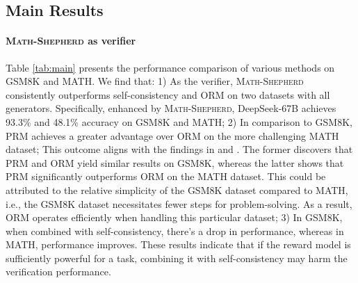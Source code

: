 \documentclass{article} %
\newcommand{\methodname}{\textsc{Math-Shepherd}\xspace}
\begin{document}
\subsection{Main Results}
\paragraph{\methodname as verifier}
Table \ref{tab:main} presents the performance comparison of various methods on GSM8K and MATH. 
We find that:
1) As the verifier, \methodname consistently outperforms self-consistency and ORM on two datasets with all generators. Specifically, enhanced by \methodname, DeepSeek-67B achieves 93.3\% and 48.1\% accuracy on GSM8K and MATH;
2) In comparison to GSM8K, PRM achieves a greater advantage over ORM on the more challenging MATH dataset;
This outcome aligns with the findings in \cite{uesato2022solving} and \cite{lightman2023let}. The former discovers that PRM and ORM yield similar results on GSM8K, whereas the latter shows that PRM significantly outperforms ORM on the MATH dataset.
This could be attributed to the relative simplicity of the GSM8K dataset compared to MATH, i.e., the GSM8K dataset necessitates fewer steps for problem-solving. 
As a result, ORM operates efficiently when handling this particular dataset;
3) In GSM8K, when combined with self-consistency, there's a drop in performance, whereas in MATH, performance improves. These results indicate that if the reward model is sufficiently powerful for a task, combining it with self-consistency may harm the verification performance.
\end{document}
